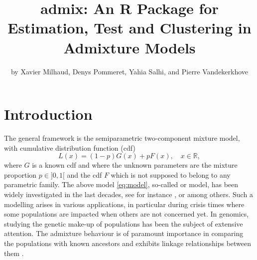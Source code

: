 \title{admix: An R Package for Estimation, Test and Clustering in Admixture Models}


\author{by Xavier Milhaud, Denys Pommeret, Yahia Salhi, and Pierre Vandekerkhove}

\maketitle


\section{Introduction}\label{introduction}

The general framework is the semiparametric two-component mixture model, with cumulative distribution function (cdf)
\begin{equation}
 L(x) = (1-p)G(x)+pF(x), \quad x \in \mathbb{R},
 \label{eq:model}
\end{equation}
where \(G\) is a known cdf and where the unknown parameters are the mixture proportion \(p\in ]0,1[\) and the cdf \(F\) which is not supposed to belong to any parametric family. The above model \eqref{eq:model}, so-called  or  model, has been widely investigated in the last decades, see for instance \citet{Bordes+Vandekerkhove:2010}, \citet{Cai+Jin:2010} or \citet{Celisse+Robin:2010} among others. Such a modelling arises in various applications, in particular during crisis times where some populations are impacted when others are not concerned yet. In genomics, studying the genetic make-up of populations has been the subject of extensive attention. The admixture behaviour is of paramount importance in comparing the populations with known ancestors and exhibits linkage relationships between them \citep{Loh+Lipson+Patterson+Moorjani+Pickrell+Reich+Berger:2013}.

